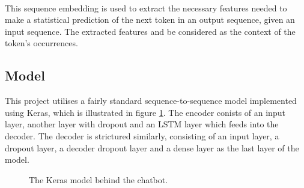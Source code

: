 \documentclass{article}
\begin{document}
\paragraph{}
This sequence embedding is used to extract the necessary features needed to
make a statistical prediction of the next token in an output sequence, given an
input sequence. The extracted features and be considered as the context of the
token's occurrences.

\subsection*{Model}
This project utilises a fairly standard sequence-to-sequence model implemented
using Keras, which is illustrated in figure \ref{fig:keras-model}. The encoder
conists of an input layer, another layer with dropout and an LSTM layer which
feeds into the decoder. The decoder is strictured similarly, consisting of an
input layer, a dropout layer, a decoder dropout layer and a dense layer as the
last layer of the model.

\begin{center}
  \begin{figure}[hbt]
    \centering
    \caption{The Keras model behind the chatbot.}
    \label{fig:keras-model}
  \end{figure}
\end{center}
\end{document}
